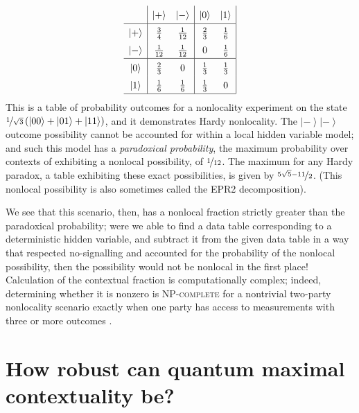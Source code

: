 \documentclass{amsart}
\theoremstyle{definition}
\newcommand{\ket}[1]{{\left\vert{#1}\right\rangle}}
\begin{document}
\begin{equation}\renewcommand{\arraystretch}{1.5}
\begin{array}{c| c c | c c |} \renewcommand{\arraystretch}{1.5}
&\ket{+}&\ket{-}&\ket{0}&\ket{1}\\\hline
\ket{+}&\frac{3}{4} &\frac{1}{12}  &\frac{2}{3} & \frac{1}{6}\\
\ket{-}&\frac{1}{12} &\frac{1}{12}  &0 &\frac{1}{6}\\ \hline
\ket{0}&\frac{2}{3}&0&\frac{1}{3} &\frac{1}{3} \\
\ket{1}&\frac{1}{6}&\frac{1}{6} &\frac{1}{3} &0 \\ \hline
\end{array} \renewcommand{\arraystretch}{1}
\end{equation}
This is a table of probability outcomes for a nonlocality experiment on the state $\nicefrac{1}{\sqrt{3}}\left(\ket{00}+\ket{01}+\ket{11}\right)$, and it demonstrates Hardy nonlocality. The $\ket{-}\ket{-}$ outcome possibility cannot be accounted for within a local hidden variable model; and such this model has a \emph{paradoxical probability}, the maximum probability over contexts of exhibiting a nonlocal possibility, of $\nicefrac{1}{12}$. The maximum for any Hardy paradox, a table exhibiting these exact possibilities, is given by $\nicefrac{5\sqrt{5}-11}{2}$. (This nonlocal possibility is also sometimes called the EPR2 decomposition).

We see that this scenario, then, has a nonlocal fraction strictly greater than the paradoxical probability; were we able to find a data table corresponding to a deterministic hidden variable, and subtract it from the given data table in a way that respected no-signalling and accounted for the probability of the nonlocal possibility, then the possibility would not be nonlocal in the first place!
Calculation of the contextual fraction is computationally complex; indeed, determining whether it is nonzero is \textsc{NP-complete} for a 
nontrivial two-party nonlocality scenario exactly when one party has access to measurements with three or more outcomes \cite{SimmCC}.




\section{How robust can quantum maximal contextuality be?}
\end{document}
